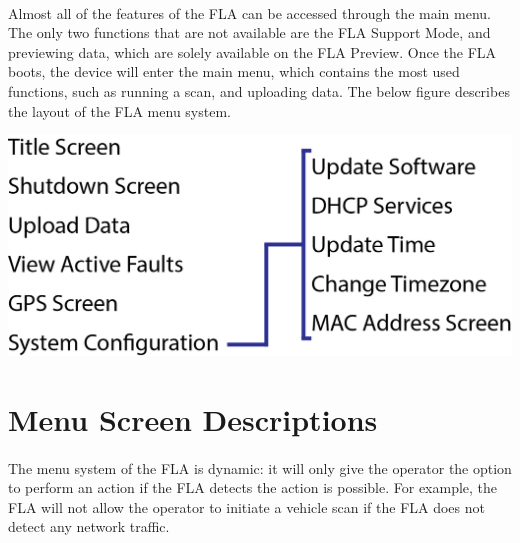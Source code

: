 \documentclass[11pt, oneside]{book}
\begin{document}
\paragraph{  }

Almost all of the features of the FLA can be accessed through the
main menu. The only two functions that are not available are the FLA Support Mode, and previewing data, which are solely available on the FLA Preview. Once the FLA boots, the device will enter the main menu, which contains the most used functions, such as running a scan, and uploading data. The below figure describes the layout of the FLA menu system.
\begin{center}
\includegraphics[width=\linewidth]{../media/graphics/menu_system}
\end{center}
\paragraph{  }


\section{Menu Screen Descriptions\label{sec:Menu-Screen-Descriptions}}
\paragraph{  }
The menu system of the FLA is dynamic: it will only give the operator the option to perform an action if the FLA detects the action is possible. For example,
the FLA will not allow the operator to initiate a vehicle scan if the FLA does not detect any network traffic.
\end{document}
